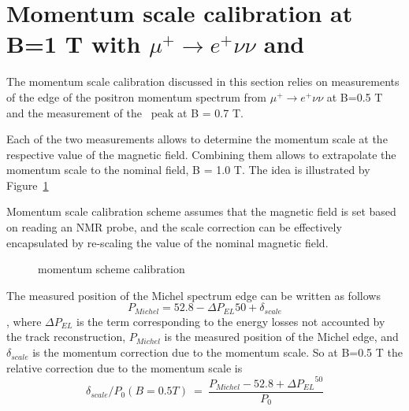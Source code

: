 \section{Momentum scale calibration at B=1 T with  $\mu^+ \to e^+ \nu \nu$  and \piplusenu }

The momentum scale calibration discussed in this section relies on measurements
of the edge of the positron momentum spectrum from $\mu^+ \to e^+ \nu \nu$ at B=0.5 T
and the measurement of the \piplusenu\ peak at B = 0.7 T.

Each of the two measurements allows to determine the momentum scale at the
respective value of the magnetic field. Combining them allows to extrapolate
the momentum scale to the nominal field, B = 1.0 T.
The idea is illustrated by Figure~\ref{figure:momentum_scale}

Momentum scale calibration scheme assumes that the magnetic field is set based
on reading an NMR probe, and the scale correction can be effectively encapsulated
by re-scaling the value of the nominal magnetic field. 

\begin{figure}[H]
  \caption{
    \label{figure:momentum_scale}
    momentum scheme calibration
  }
\end{figure}

The measured position of the Michel spectrum edge can be written as follows 
$$
    P_{Michel} = 52.8 - \Delta{P_{EL}}{50} + \delta_{scale}
$$
, where  $\Delta P_{EL}$ is the term corresponding to the energy losses not accounted
by the track reconstruction, $P_{Michel}$ is the measured position of the Michel edge,
and $\delta_{scale}$ is the momentum correction due to the momentum scale.
So at B=0.5 T the relative correction due to the momentum scale is 
$$
 \delta_{scale}/P_0 (B = 0.5 T) ~=~ \frac {P_{Michel}- 52.8 + \Delta{P_{EL}}^{50}}{P_0}
$$

